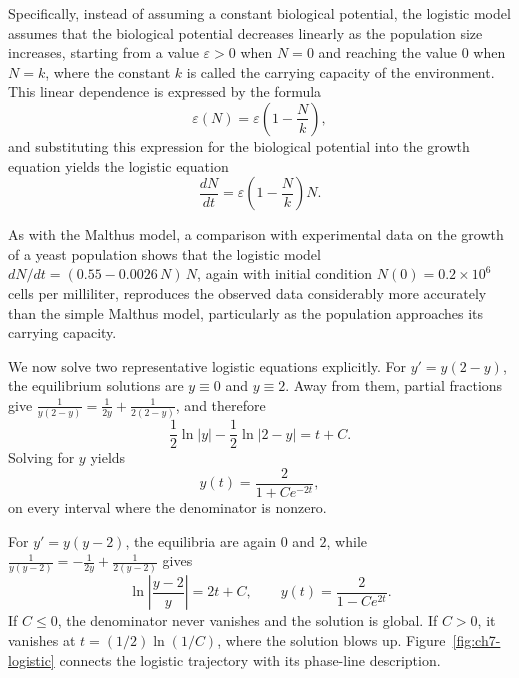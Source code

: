 Specifically, instead of assuming a constant biological potential, the logistic model assumes that the biological potential decreases linearly as the population size increases, starting from a value $\varepsilon > 0$ when $N = 0$ and reaching the value $0$ when $N = k$, where the constant $k$ is called the carrying capacity of the environment. This linear dependence is expressed by the formula
\[
\varepsilon(N) = \varepsilon \left( 1 - \frac{N}{k} \right),
\]
and substituting this expression for the biological potential into the growth equation yields the logistic equation
\[
\frac{dN}{dt} = \varepsilon \left( 1 - \frac{N}{k} \right) N.
\]

As with the Malthus model, a comparison with experimental data on the growth of a yeast population shows that the logistic model $dN/dt = (0.55 - 0.0026\, N)\, N$, again with initial condition $N(0) = 0.2 \times 10^6$ cells per milliliter, reproduces the observed data considerably more accurately than the simple Malthus model, particularly as the population approaches its carrying capacity.

We now solve two representative logistic equations explicitly. For $y'=y(2-y)$, the equilibrium solutions are $y\equiv0$ and $y\equiv2$. Away from
them, partial fractions give $\frac1{y(2-y)}=\frac1{2y}+\frac1{2(2-y)}$, and therefore
\[
\frac12\ln|y|-\frac12\ln|2-y|=t+C.
\]
Solving for $y$ yields
\[
y(t)=\frac{2}{1+Ce^{-2t}},
\]
on every interval where the denominator is nonzero.

For $y'=y(y-2)$, the equilibria are again $0$ and $2$, while $\frac1{y(y-2)}=-\frac1{2y}+\frac1{2(y-2)}$ gives
\[
\ln\left|\frac{y-2}{y}\right|=2t+C,
\qquad
y(t)=\frac{2}{1-Ce^{2t}}.
\]
If $C\leq0$, the denominator never vanishes and the solution is global.
If $C>0$, it vanishes at $t=(1/2)\ln(1/C)$, where the solution blows
up. Figure~\ref{fig:ch7-logistic} connects the logistic trajectory with its phase-line description.

